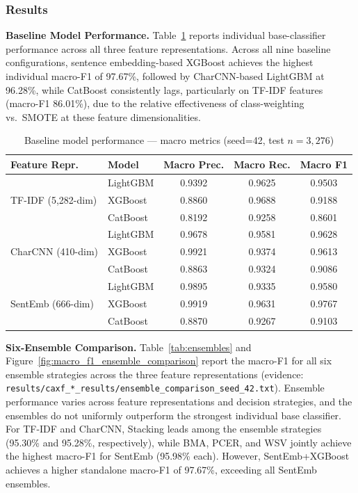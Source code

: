 \documentclass[11pt,a4paper]{article}
\begin{document}
\subsubsection{Results}

\textbf{Baseline Model Performance.}
Table~\ref{tab:baselines} reports individual base-classifier performance across all three feature
representations.
Across all nine baseline configurations, sentence embedding-based XGBoost achieves the highest
individual macro-F1 of 97.67\%, followed by CharCNN-based LightGBM at 96.28\%, while CatBoost
consistently lags, particularly on TF-IDF features (macro-F1 86.01\%), due to the relative
effectiveness of class-weighting vs.\ SMOTE at these feature dimensionalities.

\begin{table}[ht]
\centering
\caption{Baseline model performance --- macro metrics (seed=42, test $n{=}3{,}276$)}
\label{tab:baselines}
\begin{tabular}{llccc}
\toprule
\textbf{Feature Repr.} & \textbf{Model} & \textbf{Macro Prec.} & \textbf{Macro Rec.} & \textbf{Macro F1} \\
\midrule
\multirow{3}{*}{TF-IDF (5,282-dim)}
  & LightGBM & 0.9392 & 0.9625 & 0.9503 \\
  & XGBoost  & 0.8860 & 0.9688 & 0.9188 \\
  & CatBoost & 0.8192 & 0.9258 & 0.8601 \\
\midrule
\multirow{3}{*}{CharCNN (410-dim)}
  & LightGBM & 0.9678 & 0.9581 & 0.9628 \\
  & XGBoost  & 0.9921 & 0.9374 & 0.9613 \\
  & CatBoost & 0.8863 & 0.9324 & 0.9086 \\
\midrule
\multirow{3}{*}{SentEmb (666-dim)}
  & LightGBM & 0.9895 & 0.9335 & 0.9580 \\
  & XGBoost  & 0.9919 & 0.9631 & 0.9767 \\
  & CatBoost & 0.8870 & 0.9267 & 0.9103 \\
\bottomrule
\end{tabular}
\end{table}

\textbf{Six-Ensemble Comparison.}
Table~\ref{tab:ensembles} and Figure~\ref{fig:macro_f1_ensemble_comparison} report the macro-F1 for all six ensemble strategies across the three
feature representations (evidence: \texttt{results/caxf\_*\_results/ensemble\_comparison\_seed\_42.txt}).
Ensemble performance varies across feature representations and decision strategies, and the ensembles do not uniformly outperform the strongest individual base classifier.
For TF-IDF and CharCNN, Stacking leads among the ensemble strategies (95.30\% and 95.28\%,
respectively), while BMA, PCER, and WSV jointly achieve the highest macro-F1 for SentEmb (95.98\% each). However,
SentEmb+XGBoost achieves a higher standalone macro-F1 of 97.67\%, exceeding all SentEmb ensembles.
\end{document}
